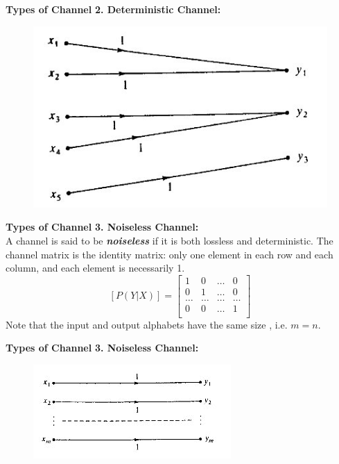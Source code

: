 \documentclass[a4]{beamer}
\begin{document}
\noindent \textbf{Types of Channel}
\textbf{2. Deterministic Channel:}\\
\begin{figure}
\centering
\includegraphics[width=0.7\linewidth]{./11Bdeterministic}
\caption{}
\label{fig:11Bdeterministic}
\end{figure}




\noindent \textbf{Types of Channel}
\textbf{3. Noiseless Channel:}\\
A channel is said to be \emph{\textbf{noiseless}} if it is both lossless and deterministic.
The channel matrix is the identity matrix: only one element in each row and each column, and each element is necessarily 1.
\[  [P(Y|X)]  = \left[ \begin{array}{cccc}
1 &0 & \ldots & 0 \\
0 & 1& \ldots & 0 \\
\ldots & \ldots & \ldots & \ldots \\
0& 0 & \ldots & 1 \\
\end{array} \right] \]
Note that the input and output alphabets have the same size , i.e. $m=n$.


\noindent \textbf{Types of Channel}
\textbf{3. Noiseless Channel:}\\
\begin{figure}
\centering
\includegraphics[width=0.7\linewidth]{./11BNoiseless}
\caption{}
\label{fig:11BNoiseless}
\end{figure}
\end{document}
